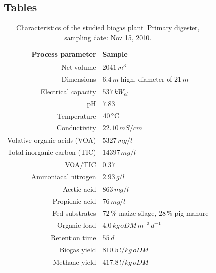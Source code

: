 \documentclass{bmcart}
\begin{document}
\begin{backmatter}


\newpage
\section*{Tables}
\begin{table}[h!]
\caption{Characteristics of the studied biogas plant. Primary digester, sampling date: Nov 15, 2010.}
\begin{tabular}{rl}
\hline
Process parameter & Sample\\
\hline
Net volume & $2041\,m^{3}$\\
Dimensions & $6.4\,m$ high, diameter of $21\,m$\\
Electrical capacity & $537\,kW_{el}$\\
\hline
pH & $7.83$\\
Temperature & $40\,^{\circ}{\rm C}$\\
Conductivity & $22.10\,mS/cm$\\
Volative organic acids (VOA) & $5327\,mg/l$\\
Total inorganic carbon (TIC) & $14397\,mg/l$\\
VOA/TIC & $0.37$\\
Ammoniacal nitrogen & $2.93\,g/l$\\
Acetic acid & $863\,mg/l$\\
Propionic acid & $76\,mg/l$\\
\hline
Fed substrates & $72\,\%$ maize silage, $28\,\%$ pig manure\\
Organic load & $4.0\,kg\,oDM\,m^{-3}\,d^{-1}$\\
Retention time & $55\,d$\\
Biogas yield & $810.5\,l/kg\,oDM$\\
Methane yield & $417.8\,l/kg\,oDM$\\
\hline
\end{tabular}
\label{tBiogasPlant}
\end{table}


\end{backmatter}
\end{document}
